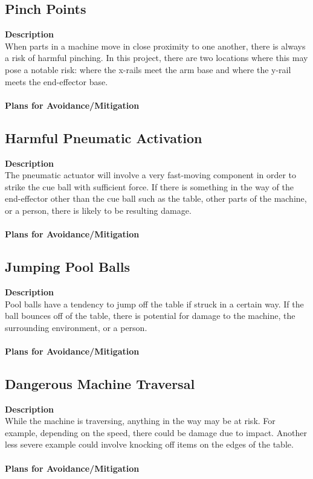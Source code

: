 \documentclass[titlepage]{article}
\begin{document}
\subsection{Pinch Points}
\textbf{Description}\\
When parts in a machine move in close proximity to one another, there is always a risk of harmful pinching. In this project, there are two locations where this may pose a notable risk: where the x-rails meet the arm base and where the y-rail meets the end-effector base.\\~\\
\textbf{Plans for Avoidance/Mitigation}\\
\subsection{Harmful Pneumatic Activation}
\textbf{Description}\\
The pneumatic actuator will involve a very fast-moving component in order to strike the cue ball with sufficient force. If there is something in the way of the end-effector other than the cue ball such as the table, other parts of the machine, or a person, there is likely to be resulting damage.\\~\\
\textbf{Plans for Avoidance/Mitigation}\\
\subsection{Jumping Pool Balls}
\textbf{Description}\\
Pool balls have a tendency to jump off the table if struck in a certain way. If the ball bounces off of the table, there is potential for damage to the machine, the surrounding environment, or a person.\\~\\
\textbf{Plans for Avoidance/Mitigation}\\
\subsection{Dangerous Machine Traversal}
\textbf{Description}\\
While the machine is traversing, anything in the way may be at risk. For example, depending on the speed, there could be damage due to impact. Another less severe example could involve knocking off items on the edges of the table.\\~\\
\textbf{Plans for Avoidance/Mitigation}\\
\end{document}
